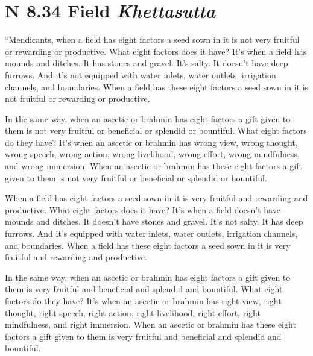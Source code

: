 \documentclass[12pt,openany]{book}%
\newcommand*{\suttatitleacronym}[1]{\smaller[2]{#1}\vspace*{.3em}}
\newcommand*{\suttatitletranslation}[1]{\linebreak{#1}}
\newcommand*{\suttatitleroot}[1]{\linebreak\smaller[2]\itshape{#1}}
\newcommand*{\tocacronym}[1]{\hspace*{-3.3em}{#1}\quad}
\newcommand*{\toctranslation}[1]{#1}
\newcommand*{\tocroot}[1]{(\textit{#1})}
\begin{document}
%
\section*{{\suttatitleacronym AN 8.34}{\suttatitletranslation A Field }{\suttatitleroot Khettasutta}}
\addcontentsline{toc}{section}{\tocacronym{AN 8.34} \toctranslation{A Field } \tocroot{Khettasutta}}

“Mendicants, when a field has eight factors a seed sown in it is not very fruitful or rewarding or productive. What eight factors does it have? It’s when a field has mounds and ditches. It has stones and gravel. It’s salty. It doesn’t have deep furrows. And it’s not equipped with water inlets, water outlets, irrigation channels, and boundaries. When a field has these eight factors a seed sown in it is not fruitful or rewarding or productive. 

In the same way, when an ascetic or brahmin has eight factors a gift given to them is not very fruitful or beneficial or splendid or bountiful. What eight factors do they have? It’s when an ascetic or brahmin has wrong view, wrong thought, wrong speech, wrong action, wrong livelihood, wrong effort, wrong mindfulness, and wrong immersion. When an ascetic or brahmin has these eight factors a gift given to them is not very fruitful or beneficial or splendid or bountiful. 

When a field has eight factors a seed sown in it is very fruitful and rewarding and productive. What eight factors does it have? It’s when a field doesn’t have mounds and ditches. It doesn’t have stones and gravel. It’s not salty. It has deep furrows. And it’s equipped with water inlets, water outlets, irrigation channels, and boundaries. When a field has these eight factors a seed sown in it is very fruitful and rewarding and productive. 

In the same way, when an ascetic or brahmin has eight factors a gift given to them is very fruitful and beneficial and splendid and bountiful. What eight factors do they have? It’s when an ascetic or brahmin has right view, right thought, right speech, right action, right livelihood, right effort, right mindfulness, and right immersion. When an ascetic or brahmin has these eight factors a gift given to them is very fruitful and beneficial and splendid and bountiful. 
\end{document}

